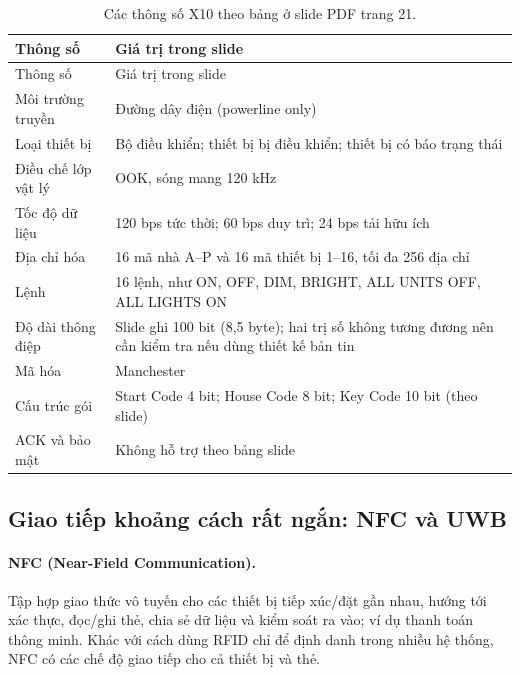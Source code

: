\begin{longtable}{p{}p{}}
\caption{Các thông số X10 theo bảng ở slide PDF trang 21.}\\\toprule
Thông số & Giá trị trong slide\\\midrule\endfirsthead
\toprule Thông số & Giá trị trong slide\\\midrule\endhead
Môi trường truyền & Đường dây điện (powerline only)\\
Loại thiết bị & Bộ điều khiển; thiết bị bị điều khiển; thiết bị có báo trạng thái\\
Điều chế lớp vật lý & OOK, sóng mang 120 kHz\\
Tốc độ dữ liệu & 120 bps tức thời; 60 bps duy trì; 24 bps tải hữu ích\\
Địa chỉ hóa & 16 mã nhà A--P và 16 mã thiết bị 1--16, tối đa 256 địa chỉ\\
Lệnh & 16 lệnh, như ON, OFF, DIM, BRIGHT, ALL UNITS OFF, ALL LIGHTS ON\\
Độ dài thông điệp & Slide ghi 100 bit (8,5 byte); hai trị số không tương đương nên cần kiểm tra nếu dùng thiết kế bản tin\\
Mã hóa & Manchester\\
Cấu trúc gói & Start Code 4 bit; House Code 8 bit; Key Code 10 bit (theo slide)\\
ACK và bảo mật & Không hỗ trợ theo bảng slide\\\bottomrule
\end{longtable}

\subsection{Giao tiếp khoảng cách rất ngắn: NFC và UWB}
\paragraph{NFC (Near-Field Communication).} Tập hợp giao thức vô tuyến cho các thiết bị tiếp xúc/đặt gần nhau, hướng tới xác thực, đọc/ghi thẻ, chia sẻ dữ liệu và kiểm soát ra vào; ví dụ thanh toán thông minh. Khác với cách dùng RFID chỉ để định danh trong nhiều hệ thống, NFC có các chế độ giao tiếp cho cả thiết bị và thẻ. 

